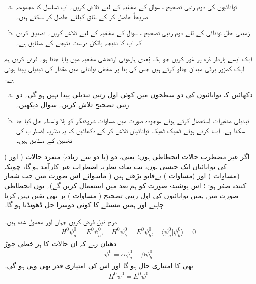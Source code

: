 \begin{enumerate}[a.]
\item
توانائیوں کی  دوم رتبی  تصحیح  ،  سوال     کے  مخفیہ کے لیے تلاش کریں۔   آپ تسلسل کا مجموعہ صریحاً حاصل کر کے طاق  کیلئے   حاصل کر سکتے ہیں۔
\item
زمینی حال توانائی کے لئے دوم رتبی تصحیح  ،  سوال    کے مخفیہ کے لیے تلاش کریں۔ تصدیق کریں  کہ آپ کا نتیجہ بالکل درست نتیجے کے مطابق ہے۔ 
\end{enumerate}
ایک ایسے  باردار  ذرہ پر غور کریں جو یک بُعدی ہارمونی ارتعاشی مخفیہ  میں پایا جاتا ہو۔ فرض کریں  ہم ایک کمزور برقی میدان  چالو کرتے ہیں جس کی بنا پر مخفی توانائی میں  مقدار کی تبدیلی پیدا ہوتی ہے۔
\begin{enumerate}[a.]
\item
دکھائیں کہ توانائیوں کی  دو سطحوں میں کوئی اول رتبی تبدیلی پیدا نہیں ہو گی۔ دو رتبی تصحیح  تلاش کریں۔  سوال    دیکھیں۔
\item
تبدیلی متغیرات  استعمال کرتے ہوئے موجودہ صورت میں مساوات  شروڈنگر  کو بلا واسطہ حل کیا جا سکتا ہے۔ ایسا کرتے ہوئے ٹھیک ٹھیک توانائیاں تلاش کر کے دکھائیں کہ یہ نظریہ اضطراب کی تخمین کے مطابق ہیں۔
\end{enumerate}




اگر غیر مضطرب حالات انحطاطی ہوں؛  یعنی،  دو (یا دو سے زیادہ)  منفرد حالات (  اور )  کی توانائیاں ایک  جیسی ہوں،  تب سادہ نظریہ اضطراب غیر کارآمد ہو گا،  چونکہ  (مساوات  )   اور  (مساوات )  بےقابو بڑھتے ہیں  ( ماسوائے اس صورت میں  جب شمار کنندہ صفر ہو:  ؛  اس  پوشیدہ   صورت   کو ہم بعد میں استعمال کریں گے)۔ یوں  انحطاطی صورت میں ہمیں توانائیوں کی اول  رتبی تصحیح ( مساوات )   پر بھی یقین نہیں کرنا چاہیے اور ہمیں مسئلے کا کوئی دوسرا حل ڈھونڈنا   ہو گا۔


درج ذیل فرض کریں جہاں  اور  معمول شدہ ہیں۔
\begin{align}\label{مساوات_غیر_مضطرب_دو_پڑتا_اضطراب}
H^0 \psi_a^0 = E^0 \psi_a^0, \quad H^0 \psi_b^0 = E^0 \psi_b^0, \quad \langle \psi_a^0 | \psi_b^0 \rangle = 0
\end{align}
دھیان رہے کہ ان حالات کا ہر خطی جوڑ 
\begin{align}\label{مساوات_غیر_مضطرب_دو_پڑتا_عمومی}
\psi^0 = \alpha \psi_a^0 + \beta \psi_b^0
\end{align}
بھی  کا امتیازی حال ہو گا اور اس  کی  امتیازی قدر  بھی وہی ہو گی۔ 
\begin{align}\label{مساوات_غیر_مضطرب_دو_پڑتا_وہی_توانائی}
H^0 \psi^0 = E^0 \psi^0
\end{align}

